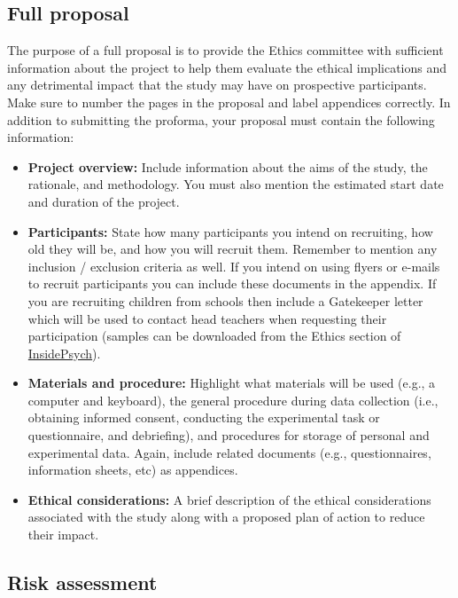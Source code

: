 \documentclass[12pt,]{book}
\theoremstyle{definition}
\theoremstyle{definition}
\theoremstyle{definition}
\theoremstyle{remark}
\begin{document}
\subsection{Full proposal}\label{full-proposal}

The purpose of a full proposal is to provide the Ethics committee with
sufficient information about the project to help them evaluate the
ethical implications and any detrimental impact that the study may have
on prospective participants. Make sure to number the pages in the
proposal and label appendices correctly. In addition to submitting the
proforma, your proposal must contain the following information:

\begin{itemize}
\item
  \textbf{Project overview:} Include information about the aims of the
  study, the rationale, and methodology. You must also mention the
  estimated start date and duration of the project.
\item
  \textbf{Participants:} State how many participants you intend on
  recruiting, how old they will be, and how you will recruit them.
  Remember to mention any inclusion / exclusion criteria as well. If you
  intend on using flyers or e-mails to recruit participants you can
  include these documents in the appendix. If you are recruiting
  children from schools then include a Gatekeeper letter which will be
  used to contact head teachers when requesting their participation
  (samples can be downloaded from the Ethics section of
  \href{https://inside.psych.cf.ac.uk/}{InsidePsych}).
\item
  \textbf{Materials and procedure:} Highlight what materials will be
  used (e.g., a computer and keyboard), the general procedure during
  data collection (i.e., obtaining informed consent, conducting the
  experimental task or questionnaire, and debriefing), and procedures
  for storage of personal and experimental data. Again, include related
  documents (e.g., questionnaires, information sheets, etc) as
  appendices.
\item
  \textbf{Ethical considerations:} A brief description of the ethical
  considerations associated with the study along with a proposed plan of
  action to reduce their impact.
\end{itemize}

\subsection{Risk assessment}\label{risk-assessment}
\end{document}
